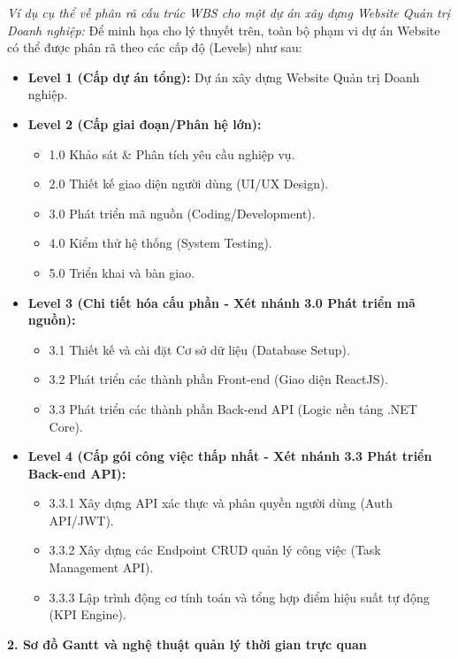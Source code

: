 \documentclass[a4paper,13.5pt]{extreport}
\begin{document}
\textit{Ví dụ cụ thể về phân rã cấu trúc WBS cho một dự án xây dựng Website Quản trị Doanh nghiệp:}
Để minh họa cho lý thuyết trên, toàn bộ phạm vi dự án Website có thể được phân rã theo các cấp độ (Levels) như sau:
\begin{itemize}
    \item \textbf{Level 1 (Cấp dự án tổng):} Dự án xây dựng Website Quản trị Doanh nghiệp.
    \item \textbf{Level 2 (Cấp giai đoạn/Phân hệ lớn):}
        \begin{itemize}
            \item 1.0 Khảo sát \& Phân tích yêu cầu nghiệp vụ.
            \item 2.0 Thiết kế giao diện người dùng (UI/UX Design).
            \item 3.0 Phát triển mã nguồn (Coding/Development).
            \item 4.0 Kiểm thử hệ thống (System Testing).
            \item 5.0 Triển khai và bàn giao.
        \end{itemize}
    \item \textbf{Level 3 (Chi tiết hóa cấu phần - Xét nhánh 3.0 Phát triển mã nguồn):}
        \begin{itemize}
            \item 3.1 Thiết kế và cài đặt Cơ sở dữ liệu (Database Setup).
            \item 3.2 Phát triển các thành phần Front-end (Giao diện ReactJS).
            \item 3.3 Phát triển các thành phần Back-end API (Logic nền tảng .NET Core).
        \end{itemize}
    \item \textbf{Level 4 (Cấp gói công việc thấp nhất - Xét nhánh 3.3 Phát triển Back-end API):}
        \begin{itemize}
            \item 3.3.1 Xây dựng API xác thực và phân quyền người dùng (Auth API/JWT).
            \item 3.3.2 Xây dựng các Endpoint CRUD quản lý công việc (Task Management API).
            \item 3.3.3 Lập trình động cơ tính toán và tổng hợp điểm hiệu suất tự động (KPI Engine).
        \end{itemize}
 \end{itemize}

\textbf{2. Sơ đồ Gantt và nghệ thuật quản lý thời gian trực quan}
\end{document}
